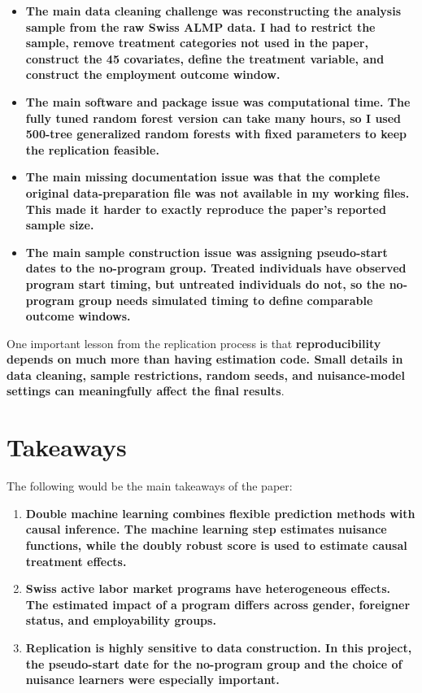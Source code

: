 \documentclass[12pt]{article}
\begin{document}
\begin{itemize}
    \item \textbf{The main data cleaning challenge was reconstructing the analysis sample from the raw Swiss ALMP data. I had to restrict the sample, remove treatment categories not used in the paper, construct the 45 covariates, define the treatment variable, and construct the employment outcome window.}
    \item \textbf{The main software and package issue was computational time. The fully tuned random forest version can take many hours, so I used 500-tree generalized random forests with fixed parameters to keep the replication feasible.}
    \item \textbf{The main missing documentation issue was that the complete original data-preparation file was not available in my working files. This made it harder to exactly reproduce the paper's reported sample size.}
    \item \textbf{The main sample construction issue was assigning pseudo-start dates to the no-program group. Treated individuals have observed program start timing, but untreated individuals do not, so the no-program group needs simulated timing to define comparable outcome windows.}
\end{itemize}

One important lesson from the replication process is that \textbf{reproducibility depends on much more than having estimation code. Small details in data cleaning, sample restrictions, random seeds, and nuisance-model settings can meaningfully affect the final results}.

\section{Takeaways}

The following would be the main takeaways of the paper:

\begin{enumerate}
    \item \textbf{Double machine learning combines flexible prediction methods with causal inference. The machine learning step estimates nuisance functions, while the doubly robust score is used to estimate causal treatment effects.}
    \item \textbf{Swiss active labor market programs have heterogeneous effects. The estimated impact of a program differs across gender, foreigner status, and employability groups.}
    \item \textbf{Replication is highly sensitive to data construction. In this project, the pseudo-start date for the no-program group and the choice of nuisance learners were especially important.}
\end{enumerate}
\end{document}
